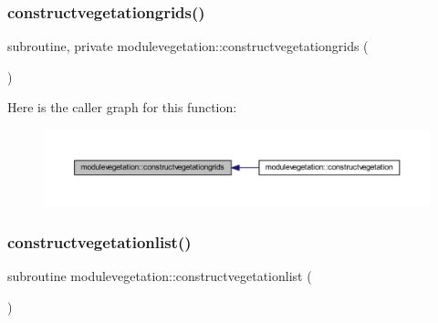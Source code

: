 \subsubsection{\texorpdfstring{constructvegetationgrids()}{constructvegetationgrids()}}
{\footnotesize\ttfamily subroutine, private modulevegetation\+::constructvegetationgrids (\begin{DoxyParamCaption}{ }\end{DoxyParamCaption})\hspace{0.3cm}{\ttfamily [private]}}

Here is the caller graph for this function\+:\nopagebreak
\begin{figure}[H]
\begin{center}
\leavevmode
\includegraphics[width=350pt]{namespacemodulevegetation_a244fa0ac53269288775789c370d4ef6e_icgraph}
\end{center}
\end{figure}
\mbox{\label{namespacemodulevegetation_a73de44a26d2dff28225fc8df134023fc}} 
\subsubsection{\texorpdfstring{constructvegetationlist()}{constructvegetationlist()}}
{\footnotesize\ttfamily subroutine modulevegetation\+::constructvegetationlist (\begin{DoxyParamCaption}{ }\end{DoxyParamCaption})\hspace{0.3cm}{\ttfamily [private]}}

